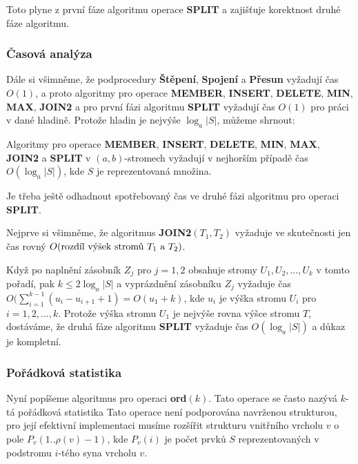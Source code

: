 \documentclass[a4paper,12pt]{article}
\begin{document}
Toto plyne z první fáze algoritmu operace {\bf SPLIT} a zajišťuje 
korektnost druhé fáze algoritmu. 

\subsubsection{Časová analýza}


Dále si všimněme, že podprocedury {\bf Štěpení}, {\bf Spojení} a {\bf Pře\-sun }
vyžadují čas $O(1)$, a proto algoritmy pro operace {\bf MEMBER}, 
{\bf INSERT}, {\bf DELETE}, {\bf MIN}, {\bf MAX}, {\bf JOIN2} a pro první fázi algoritmu 
{\bf SPLIT} vyžadují čas $O(1)$ pro práci v dané hladině.  Protože 
hladin je nejvýše $\log_a|S|$, můžeme shrnout: 

\begin{veta}Algoritmy pro operace {\bf MEMBER}, {\bf INSERT}, 
{\bf DE\-LETE}, {\bf MIN}, {\bf MAX}, {\bf JOIN2} a {\bf SPLIT} v $
(a,b)$-stromech vy\-žadují 
v nejhorším případě čas $O(\log_a|S|)$, kde $
S$ je 
re\-pre\-zen\-tovaná množina.  
\end{veta}

Je třeba ještě odhadnout spotřebovaný čas ve druhé fázi 
algoritmu pro operaci {\bf SPLIT}. 

Nejprve si všimněme, že 
algoritmus {\bf JOIN2$(T_1,T_2)$} vyžaduje ve skutečnosti jen čas 
rovný 
$O(\text{\rm rozdíl výšek stromů }T_1\text{\rm \ a }
T_2)$. 

Když po naplnění 
zásobník $Z_j$ pro $j=1,2$ obsahuje stromy $U_1,U_2,\dots,U_
k$ v tomto 
pořadí, pak $k\le 2\log_a|S|$ a vyprázdnění zásobníku $
Z_j$ 
vyžaduje 
čas $O(\sum_{i=1}^{k-1}(u_i-u_{i+1}+1)=O(u_1+k)$, kde $u_i$ je výška stromu $
U_i$ pro 
$i=1,2,\dots,k$. Protože výška stromu $U_1$ je nejvýše rovna výšce 
stromu $T$, dostáváme, že druhá fáze algoritmu {\bf SPLIT} vyžaduje 
čas $O(\log_a|S|)$ a důkaz je kompletní. 

\subsubsection{Pořádková statistika}


Nyní popíšeme algoritmus pro operaci {\bf ord$
(k)$}. Tato 
operace se často nazývá $k$-tá pořádko\-vá statistika
Tato operace není podporována navrženou 
strukturou, pro její efektivní implementaci musíme 
rozšířit strukturu vnitřního vrcholu $v$ o pole\newline 
$P_v(1..\rho (v)-1)$, kde $P_v(i)$ je počet prvků $S$ reprezentovaných 
v podstromu $i$-tého syna vrcholu $v$.
\end{document}
